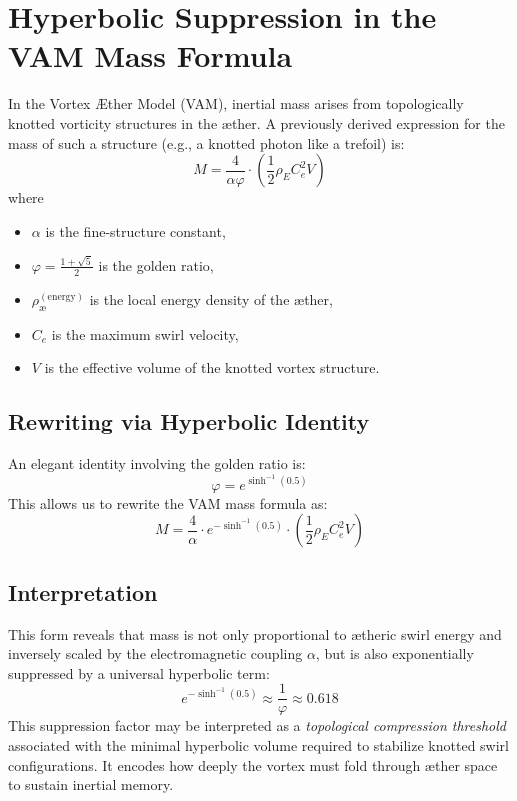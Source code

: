 \section{Hyperbolic Suppression in the VAM Mass Formula}

In the Vortex \AE{}ther Model (VAM), inertial mass arises from topologically knotted vorticity structures in the \ae{}ther. A previously derived expression for the mass of such a structure (e.g., a knotted photon like a trefoil) is:
\begin{equation}
  M = \frac{4}{\alpha \varphi} \cdot \left( \frac{1}{2} \rho_{\scriptscriptstyle\boldsymbol\!E}C_e^2 V \right)
\end{equation}
where
\begin{itemize}
\item $\alpha$ is the fine-structure constant,
\item $\varphi = \frac{1 + \sqrt{5}}{2}$ is the golden ratio,
\item $\rho_\text{\ae}^{(\text{energy})}$ is the local energy density of the \ae{}ther,
\item $C_e$ is the maximum swirl velocity,
\item $V$ is the effective volume of the knotted vortex structure.
\end{itemize}

\subsection{Rewriting via Hyperbolic Identity}

An elegant identity involving the golden ratio is:
\begin{equation}
  \varphi = e^{\sinh^{-1}(0.5)}
\end{equation}
This allows us to rewrite the VAM mass formula as:
\begin{equation}
\boxed{
M = \frac{4}{\alpha} \cdot e^{-\sinh^{-1}(0.5)} \cdot \left( \frac{1}{2} \rho_{\scriptscriptstyle\boldsymbol\!E}C_e^2 V \right)
}
\end{equation}

\subsection*{Interpretation}

This form reveals that mass is not only proportional to \ae{}theric swirl energy and inversely scaled by the electromagnetic coupling $\alpha$, but is also exponentially suppressed by a universal hyperbolic term:
\begin{equation}
  e^{-\sinh^{-1}(0.5)} \approx \frac{1}{\varphi} \approx 0.618
\end{equation}
This suppression factor may be interpreted as a \emph{topological compression threshold} associated with the minimal hyperbolic volume required to stabilize knotted swirl configurations. It encodes how deeply the vortex must fold through \ae{}ther space to sustain inertial memory.

